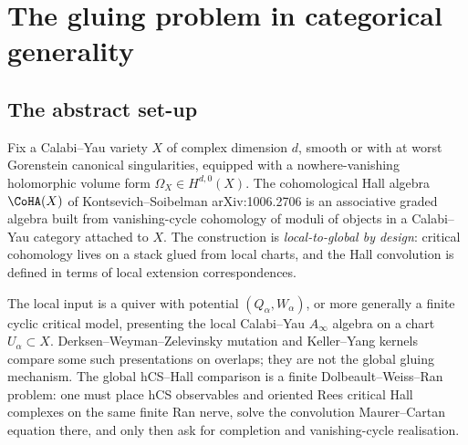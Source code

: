 \section{The gluing problem in categorical generality}
\label{sec:gluing:abstract}
\label{ch:gluing-part-i}
\subsection{The abstract set-up}
\label{sec:glue-abstract-setup}

Fix a Calabi--Yau variety $X$ of complex dimension $d$, smooth or
with at worst Gorenstein canonical singularities, equipped with a
nowhere-vanishing holomorphic volume form $\Omega_X \in
H^{d,0}(X)$. The cohomological Hall algebra $\CoHA(X)$ of
Kontsevich--Soibelman arXiv:1006.2706 is an associative graded
algebra built from vanishing-cycle cohomology of moduli of objects
in a Calabi--Yau category attached to $X$. The construction is
\emph{local-to-global by design}: critical cohomology lives on a
stack glued from local charts, and the Hall convolution is defined
in terms of local extension correspondences.

The local input is a quiver with potential $(Q_\alpha,W_\alpha)$, or
more generally a finite cyclic critical model, presenting the local
Calabi--Yau $A_\infty$ algebra on a chart $U_\alpha\subset X$.
Derksen--Weyman--Zelevinsky mutation and Keller--Yang kernels compare
some such presentations on overlaps; they are not the global gluing
mechanism. The global hCS--Hall comparison is a finite
Dolbeault--Weiss--Ran problem: one must place hCS observables and
oriented Rees critical Hall complexes on the same finite Ran nerve,
solve the convolution Maurer--Cartan equation there, and only then ask
for completion and vanishing-cycle realisation.

